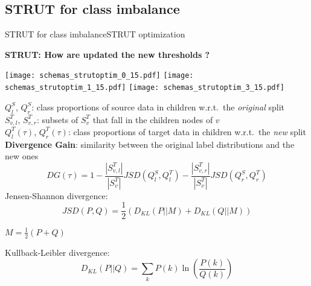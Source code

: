 \subsection{STRUT for class imbalance}

\begin{frame}{STRUT for class imbalance}{STRUT optimization}

\begin{minipage}[t]{0.4\linewidth}
    \vspace{0pt}
    
    \centering
    \textbf{STRUT: How are updated the new thresholds ?}\\

    \renewcommand{\ratio}{1.0}
    \begin{overprint}
        \texttt{[image: schemas\_strutoptim\_0\_15.pdf]}
        \texttt{[image: schemas\_strutoptim\_1\_15.pdf]}
        \texttt{[image: schemas\_strutoptim\_3\_15.pdf]}
    \end{overprint}
\end{minipage}\hfill
\begin{minipage}[t]{0.55\linewidth}
    \vspace{0pt}
    \pause \pause
    $Q_{l}^{S}$, $Q_{r}^{S}$: class proportions of source data in children w.r.t.\ the \emph{original} split\\
    $S_{v,l}^{T}$, $S_{v,r}^{T}$: subsets of $S_{v}^{T}$ that fall in the children nodes of $v$\\
    $Q_{l}^{T}(\tau)$, $Q_{r}^{T}(\tau)$: class proportions of target data in children w.r.t.\ the \emph{new} split\\
    \textbf{Divergence Gain}: similarity between the original label distributions and the new ones
    $$
    DG\left(\tau\right) = 1 - \frac{|S_{v,l}^{T}|}{|S_{v}^{T}|}JSD(Q_{l}^{S}, Q_{l}^{T})
    - \frac{|S_{v,r}^{T}|}{|S_{v}^{T}|}JSD(Q_{r}^{S}, Q_{r}^{T})
    $$
    \small
    Jensen-Shannon divergence:
    $$JSD(P, Q) = \frac{1}{2}\left(D_{KL}(P||M) + D_{KL}(Q||M)\right) $$
    \begin{flushright}
    $M = \frac{1}{2} \left(P +Q\right) $
    \end{flushright}
    Kullback-Leibler divergence:
    $$D_{KL}(P||Q) = \sum_{k}{P(k)\ln\left(\frac{P(k)}{Q(k)}\right)}$$
\end{minipage}

\end{frame}

